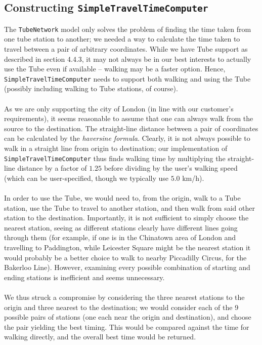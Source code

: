 \documentclass[a4paper, 10pt]{report}
\begin{document}
\subsection{Constructing \texttt{SimpleTravelTimeComputer}}
The \texttt{TubeNetwork} model only solves the problem of finding the time taken from one tube station to another; we needed a way to calculate the time taken to travel between a pair of arbitrary coordinates. While we have Tube support as described in section 4.4.3, it may not always be in our best interests to actually use the Tube even if available -- walking may be a faster option. Hence, \texttt{SimpleTravelTimeComputer} needs to support both walking and using the Tube (possibly including walking to Tube stations, of course). \\\\
As we are only supporting the city of London (in line with our customer's requirements), it seems reasonable to assume that one can always walk from the source to the destination. The straight-line distance between a pair of coordinates can be calculated by the \textit{haversine formula}. \cite{haversine} Clearly, it is not always possible to walk in a straight line from origin to destination; our implementation of \texttt{SimpleTravelTimeComputer} thus finds walking time by multiplying the straight-line distance by a factor of $1.25$ before dividing by the user's walking speed (which can be user-specified, though we typically use $5.0$ km/h). \\\\
In order to use the Tube, we would need to, from the origin, walk to a Tube station, use the Tube to travel to another station, and then walk from said other station to the destination. Importantly, it is not sufficient to simply choose the nearest station, seeing as different stations clearly have different lines going through them (for example, if one is in the Chinatown area of London and travelling to Paddington, while Leicester Square might be the nearest station it would probably be a better choice to walk to nearby Piccadilly Circus, for the Bakerloo Line). However, examining every possible combination of starting and ending stations is inefficient and seems unnecessary. 
\\\\We thus struck a compromise by considering the three nearest stations to the origin and three nearest to the destination; we would consider each of the 9 possible pairs of stations (one each near the origin and destination), and choose the pair yielding the best timing. This would be compared against the time for walking directly, and the overall best time would be returned.
\end{document}
